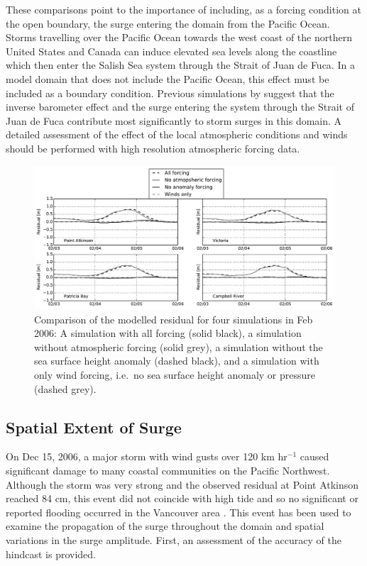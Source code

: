 \documentclass[pdftex,10pt]{article}
\begin{document}
These comparisons point to the importance of including, as a forcing condition at the open boundary, the surge entering the domain from the Pacific Ocean. Storms travelling over the Pacific Ocean towards the west coast of the northern United States and Canada can induce elevated sea levels along the coastline which then enter the Salish Sea system through the Strait of Juan de Fuca. In a model domain that does not include the Pacific Ocean, this effect must be included as a boundary condition. Previous simulations by \citet{murty1995storm} suggest that the inverse barometer effect and the surge entering the system through the Strait of Juan de Fuca contribute most significantly to storm surges in this domain.  A detailed assessment of the effect of the local atmospheric conditions and winds should be performed with high resolution atmospheric forcing data.  

\begin{figure}
\centering
\includegraphics[scale=0.6]{Figures/feb2006_factors.pdf}
\caption{Comparison of the modelled residual for four simulations in Feb 2006: A simulation with all forcing (solid black), a simulation without atmospheric forcing (solid grey), a simulation without the sea surface height anomaly (dashed black), and a simulation with only wind forcing, i.e.\ no sea surface height anomaly or pressure (dashed grey). }
\label{fig:factors}
\end{figure}

\subsection{Spatial Extent of Surge}
On Dec 15, 2006, a major storm with wind gusts over 120 km hr$^{-1}$ caused significant damage to many coastal communities on the Pacific Northwest. Although the storm was very strong and the observed residual at Point Atkinson reached 84 cm, this event did not coincide with high tide and so no significant or reported flooding occurred in the Vancouver area \citep{forseth2006adaptation}. This event has been used to examine the propagation of the surge throughout the domain and spatial variations in the surge amplitude. First, an assessment of the accuracy of the hindcast is provided. 
\end{document}
